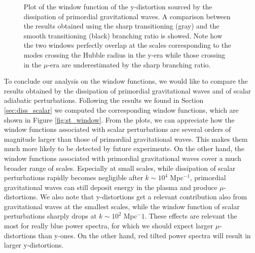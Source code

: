 \begin{figure}
    \centering
{}
\caption{Plot of the window function of the y-distortion sourced by the dissipation of primordial gravitational waves. A comparison between the results obtained using the sharp transitioning (gray) and the smooth transitioning (black) branching ratio is showed. Note how the two windows perfectly overlap at the scales corresponding to the modes crossing the Hubble radius in the y-era while those crossing in the $\mu$-era are underestimated by the sharp branching ratio. }
\label{fig:y_window}
\end{figure}
To conclude our analysis on the window functions, we would like to compare the results obtained by the dissipation of primordial gravitational waves and of scalar adiabatic perturbations. Following the results we found in Section \ref{sec:diss_scalar} we computed the corresponding window functions, which are shown in Figure \ref{fig:st_window}. From the plots, we can appreciate how the window functions associated with scalar perturbations are several orders of magnitude larger than those of primordial gravitational waves. This makes them much more likely to be detected by future experiments. On the other hand, the window functions associated with primordial gravitational waves cover a much broader range of scales. Especially at small scales, while dissipation of scalar perturbations rapidly becomes negligible after $k\sim10^{4}$ Mpc$^{-1}$, primordial gravitational waves can still deposit energy in the plasma and produce $\mu$-distortions. We also note that y-distortions get a relevant contribution also from gravitational waves at the smallest scales, while the window function of scalar perturbations sharply drops at $k\sim10^2$ Mpc$^-1$.  These effects are relevant the most for really blue power spectra, for which we should expect larger $\mu$-distortions than y-ones. On the other hand, red tilted power spectra will result in larger y-distortions.

